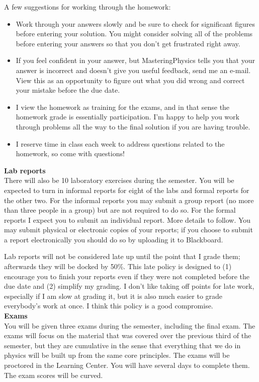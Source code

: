 \documentclass[11pt,letterpaper]{article}
\begin{document}
A few suggestions for working through the homework:
\begin{itemize}\itemsep -5pt
\item Work through your answers slowly and be sure to check for significant figures before entering your solution. You might consider solving all of the problems before entering your answers so that you don't get frustrated right away.
\item If you feel confident in your answer, but MasteringPhysics tells you that your answer is incorrect and doesn't give you useful feedback, send me an e-mail. View this as an opportunity to figure out what you did wrong and correct your mistake before the due date.%
\item I view the homework as training for the exams, and in that sense the homework grade is essentially participation. I'm happy to help you work through problems all the way to the final solution if you are having trouble. 
\item I reserve time in class each week to address questions related to the homework, so come with questions!
\end{itemize}

\textbf{Lab reports}\\
There will also be 10 laboratory exercises during the semester. You will be expected to turn in informal reports for eight of the labs and formal reports for the other two. For the informal reports you may submit a group report (no more than three people in a group) but are not required to do so. For the formal reports I expect you to submit an individual report. More details to follow. You may submit physical or electronic copies of your reports; if you choose to submit a report electronically you should do so by uploading it to Blackboard.

Lab reports will not be considered late up until the point that I grade them; afterwards they will be docked by 50\%. This late policy is designed to (1) encourage you to finish your reports even if they were not completed before the due date and (2) simplify my grading. I don't like taking off points for late work, especially if I am slow at grading it, but it is also much easier to grade everybody's work at once. I think this policy is a good compromise. 
\\

\textbf{Exams}\\
You will be given three exams during the semester, including the final exam. The exams will focus on the material that was covered over the previous third of the semester, but they are cumulative in the sense that everything that we do in physics will be built up from the same core principles. The exams will be proctored in the Learning Center. You will have several days to complete them. The exam scores will be curved.\\
\end{document}
